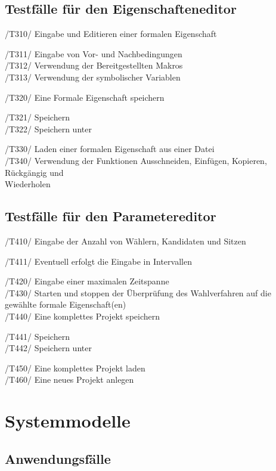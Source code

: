 \documentclass[a4paper]{scrreprt}
\begin{document}
\section{Testfälle für den Eigenschafteneditor}

/T310/ Eingabe und Editieren einer formalen Eigenschaft 
\begin{addmargin}[25pt]{0pt}
/T311/ Eingabe von Vor- und Nachbedingungen \\
/T312/ Verwendung der Bereitgestellten Makros \\
/T313/ Verwendung der symbolischer Variablen 
\end{addmargin}	
/T320/ Eine Formale Eigenschaft speichern
\begin{addmargin}[25pt]{0pt}
/T321/ Speichern \\
/T322/ Speichern unter 
\end{addmargin}	
/T330/ Laden einer formalen Eigenschaft aus einer Datei \\
/T340/ Verwendung der Funktionen Ausschneiden, Einfügen, Kopieren, Rückgängig und \\ Wiederholen
\section{Testfälle für den Parametereditor}

/T410/ Eingabe der Anzahl von Wählern, Kandidaten und Sitzen
\begin{addmargin}[25pt]{0pt}
/T411/ Eventuell erfolgt die Eingabe in Intervallen
\end{addmargin}	
/T420/ Eingabe einer maximalen Zeitspanne \\
/T430/ Starten und stoppen der Überprüfung des Wahlverfahren auf die gewählte formale Eigenschaft(en) \\
/T440/ Eine komplettes Projekt speichern 
\begin{addmargin}[25pt]{0pt}
/T441/ Speichern \\
/T442/ Speichern unter 
\end{addmargin}
/T450/ Eine komplettes Projekt laden \\
/T460/ Eine neues Projekt anlegen \\




\chapter{Systemmodelle}

\section{Anwendungsfälle}
\end{document}
